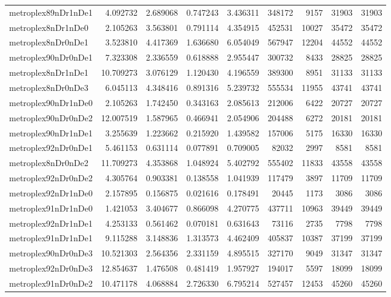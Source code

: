 \documentclass[../../../thesis.tex]{subfiles}
\begin{document}
\begin{longtable}{|l|r|r|r|r|r|r|r|r|}
metroplex89nDr1nDe1 & 4.092732 & 2.689068 & 0.747243 & 3.436311 & 348172 & 9157 & 31903 & 31903 \\
metroplex8nDr1nDe0 & 2.105263 & 3.563801 & 0.791114 & 4.354915 & 452531 & 10027 & 35472 & 35472 \\
metroplex8nDr0nDe1 & 3.523810 & 4.417369 & 1.636680 & 6.054049 & 567947 & 12204 & 44552 & 44552 \\
metroplex90nDr0nDe1 & 7.323308 & 2.336559 & 0.618888 & 2.955447 & 300732 & 8433 & 28825 & 28825 \\
metroplex8nDr1nDe1 & 10.709273 & 3.076129 & 1.120430 & 4.196559 & 389300 & 8951 & 31133 & 31133 \\
metroplex8nDr0nDe3 & 6.045113 & 4.348416 & 0.891316 & 5.239732 & 555534 & 11955 & 43741 & 43741 \\
metroplex90nDr1nDe0 & 2.105263 & 1.742450 & 0.343163 & 2.085613 & 212006 & 6422 & 20727 & 20727 \\
metroplex90nDr0nDe2 & 12.007519 & 1.587965 & 0.466941 & 2.054906 & 204488 & 6272 & 20181 & 20181 \\
metroplex90nDr1nDe1 & 3.255639 & 1.223662 & 0.215920 & 1.439582 & 157006 & 5175 & 16330 & 16330 \\
metroplex92nDr0nDe1 & 5.461153 & 0.631114 & 0.077891 & 0.709005 & 82032 & 2997 & 8581 & 8581 \\
metroplex8nDr0nDe2 & 11.709273 & 4.353868 & 1.048924 & 5.402792 & 555402 & 11833 & 43558 & 43558 \\
metroplex92nDr0nDe2 & 4.305764 & 0.903381 & 0.138558 & 1.041939 & 117479 & 3897 & 11709 & 11709 \\
metroplex92nDr1nDe0 & 2.157895 & 0.156875 & 0.021616 & 0.178491 & 20445 & 1173 & 3086 & 3086 \\
metroplex91nDr1nDe0 & 1.421053 & 3.404677 & 0.866098 & 4.270775 & 437711 & 10963 & 39449 & 39449 \\
metroplex92nDr1nDe1 & 4.253133 & 0.561462 & 0.070181 & 0.631643 & 73116 & 2735 & 7798 & 7798 \\
metroplex91nDr1nDe1 & 9.115288 & 3.148836 & 1.313573 & 4.462409 & 405837 & 10387 & 37199 & 37199 \\
metroplex90nDr0nDe3 & 10.521303 & 2.564356 & 2.331159 & 4.895515 & 327170 & 9049 & 31347 & 31347 \\
metroplex92nDr0nDe3 & 12.854637 & 1.476508 & 0.481419 & 1.957927 & 194017 & 5597 & 18099 & 18099 \\
metroplex91nDr0nDe2 & 10.471178 & 4.068884 & 2.726330 & 6.795214 & 527457 & 12453 & 45260 & 45260 \\

\end{longtable}
\end{document}
